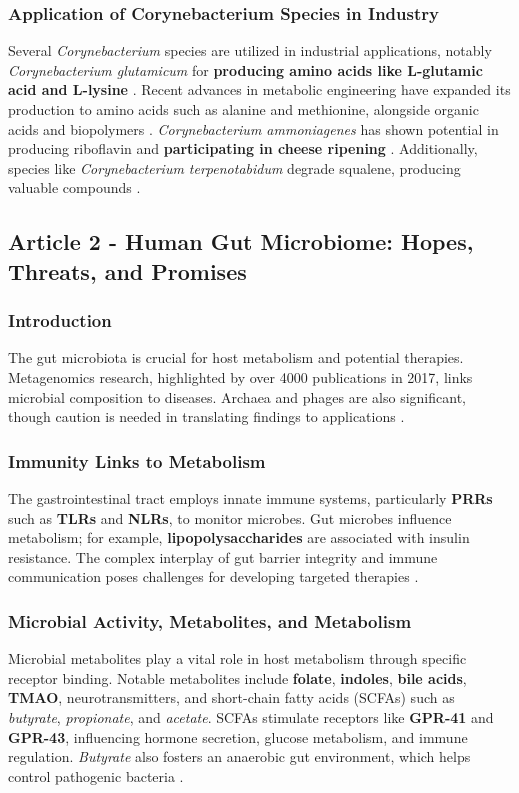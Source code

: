 \subsubsection{Application of Corynebacterium Species in Industry}
Several \textit{Corynebacterium} species are utilized in industrial applications, notably \textit{Corynebacterium glutamicum} for \textbf{producing amino acids like L-glutamic acid and L-lysine} \cite*{L9-Coryn}. Recent advances in metabolic engineering have expanded its production to amino acids such as alanine and methionine, alongside organic acids and biopolymers \cite*{L9-Coryn}. \textit{Corynebacterium ammoniagenes} has shown potential in producing riboflavin and \textbf{participating in cheese ripening} \cite*{L9-Coryn}. Additionally, species like \textit{Corynebacterium terpenotabidum} degrade squalene, producing valuable compounds \cite*{L9-Coryn}.

\subsection{Article 2 - Human Gut Microbiome: Hopes, Threats, and Promises}
\subsubsection*{Introduction}
The gut microbiota is crucial for host metabolism and potential therapies. Metagenomics research, highlighted by over 4000 publications in 2017, links microbial composition to diseases. Archaea and phages are also significant, though caution is needed in translating findings to applications \cite*{L9-HumanGut}.

\subsubsection*{Immunity Links to Metabolism}
The gastrointestinal tract employs innate immune systems, particularly \textbf{PRRs} such as \textbf{TLRs} and \textbf{NLRs}, to monitor microbes. Gut microbes influence metabolism; for example, \textbf{lipopolysaccharides} are associated with insulin resistance. The complex interplay of gut barrier integrity and immune communication poses challenges for developing targeted therapies \cite*{L9-HumanGut}.

\subsubsection*{Microbial Activity, Metabolites, and Metabolism}
Microbial metabolites play a vital role in host metabolism through specific receptor binding. Notable metabolites include \textbf{folate}, \textbf{indoles}, \textbf{bile acids}, \textbf{TMAO}, neurotransmitters, and short-chain fatty acids (SCFAs) such as \textit{butyrate}, \textit{propionate}, and \textit{acetate}. SCFAs stimulate receptors like \textbf{GPR-41} and \textbf{GPR-43}, influencing hormone secretion, glucose metabolism, and immune regulation. \textit{Butyrate} also fosters an anaerobic gut environment, which helps control pathogenic bacteria \cite*{L9-HumanGut}.

